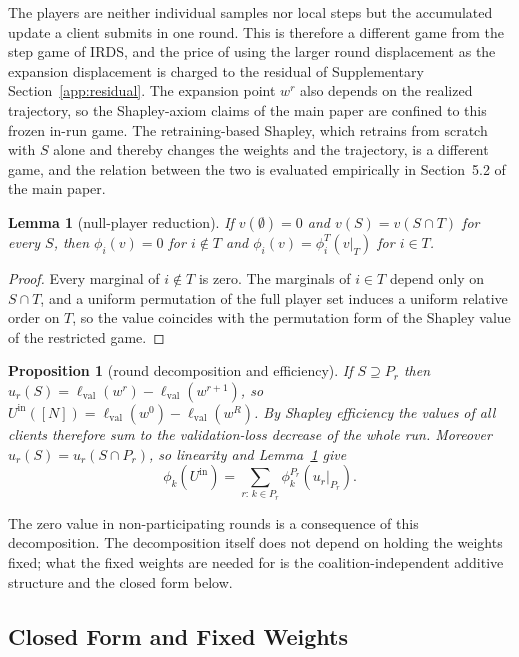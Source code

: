 \documentclass[letterpaper]{article} %
\theoremstyle{plain}
\newtheorem{proposition}{Proposition}
\newtheorem{lemma}{Lemma}
\newcommand{\lval}{\ell_{\mathrm{val}}}
\begin{document}
The players are neither individual samples nor local steps but the
accumulated update a client submits in one round. This is therefore a
different game from the step game of IRDS, and the price of using the larger
round displacement as the expansion displacement is charged to the residual
of Supplementary Section~\ref{app:residual}. The expansion point $w^r$ also
depends on the realized trajectory, so the Shapley-axiom claims of the main
paper are confined to this frozen in-run game. The retraining-based Shapley,
which retrains from scratch with $S$ alone and thereby changes the weights
and the trajectory, is a different game, and the relation between the two is
evaluated empirically in Section~5.2 of the main paper.

\begin{lemma}[null-player reduction]
\label{lem:null}
If $v(\emptyset) = 0$ and $v(S) = v(S \cap T)$ for every $S$, then
$\phi_i(v) = 0$ for $i \notin T$ and $\phi_i(v) = \phi_i^T(v|_T)$ for
$i \in T$.
\end{lemma}

\begin{proof}
Every marginal of $i \notin T$ is zero. The marginals of $i \in T$ depend
only on $S \cap T$, and a uniform permutation of the full player set induces
a uniform relative order on $T$, so the value coincides with the permutation
form of the Shapley value of the restricted game.
\end{proof}

\begin{proposition}[round decomposition and efficiency]
\label{prop:decomp}
If $S \supseteq P_r$ then $u_r(S) = \lval(w^r) - \lval(w^{r+1})$, so
$U^{\mathrm{in}}([N]) = \lval(w^0) - \lval(w^R)$. By Shapley efficiency the
values of all clients therefore sum to the validation-loss decrease of the
whole run. Moreover $u_r(S) = u_r(S \cap P_r)$, so linearity and
Lemma~\ref{lem:null} give
\[
\phi_k(U^{\mathrm{in}}) = \sum_{r:\,k \in P_r} \phi_k^{P_r}(u_r|_{P_r}).
\]
\end{proposition}

The zero value in non-participating rounds is a consequence of this
decomposition. The decomposition itself does not depend on holding the
weights fixed; what the fixed weights are needed for is the
coalition-independent additive structure and the closed form below.

\subsection{Closed Form and Fixed Weights}
\label{app:closed}
\end{document}
